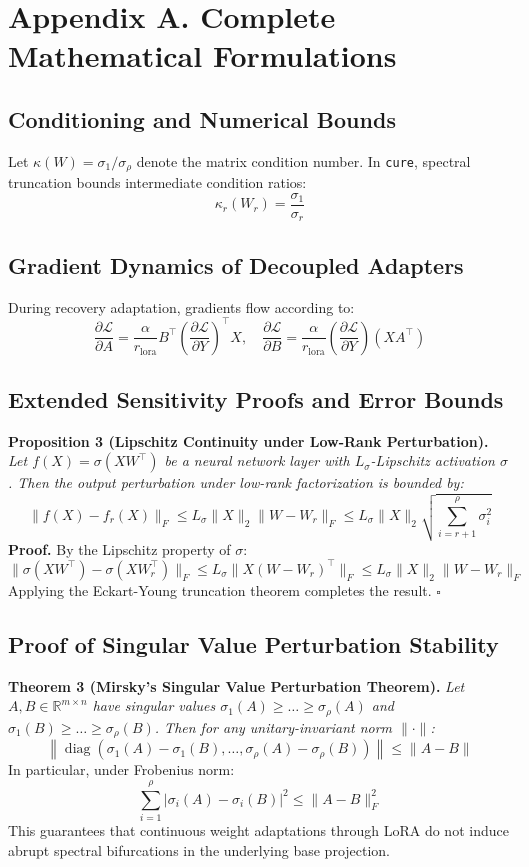 \section*{Appendix A. Complete Mathematical Formulations}

\subsection*{Conditioning and Numerical Bounds}
Let $\kappa(W) = \sigma_1 / \sigma_\rho$ denote the matrix condition number. In \texttt{cure}, spectral truncation bounds intermediate condition ratios:
\[
\kappa_r(W_r) = \frac{\sigma_1}{\sigma_r}
\]

\subsection*{Gradient Dynamics of Decoupled Adapters}
During recovery adaptation, gradients flow according to:
\[
\frac{\partial \mathcal{L}}{\partial A} = \frac{\alpha}{r_{\text{lora}}} B^\top \left( \frac{\partial \mathcal{L}}{\partial Y} \right)^\top X, \quad \frac{\partial \mathcal{L}}{\partial B} = \frac{\alpha}{r_{\text{lora}}} \left( \frac{\partial \mathcal{L}}{\partial Y} \right) (X A^\top)
\]

\subsection*{Extended Sensitivity Proofs and Error Bounds}
\textbf{Proposition 3 (Lipschitz Continuity under Low-Rank Perturbation).} \textit{Let $f(X) = \sigma(X W^\top)$ be a neural network layer with $L_\sigma$-Lipschitz activation $\sigma$. Then the output perturbation under low-rank factorization is bounded by:}
\[
\|f(X) - f_r(X)\|_F \le L_\sigma \|X\|_2 \|W - W_r\|_F \le L_\sigma \|X\|_2 \sqrt{\sum_{i=r+1}^\rho \sigma_i^2}
\]
\textbf{Proof.} By the Lipschitz property of $\sigma$:
\[
\|\sigma(X W^\top) - \sigma(X W_r^\top)\|_F \le L_\sigma \|X (W - W_r)^\top\|_F \le L_\sigma \|X\|_2 \|W - W_r\|_F
\]
Applying the Eckart-Young truncation theorem completes the result. $\square$

\subsection*{Proof of Singular Value Perturbation Stability}
\textbf{Theorem 3 (Mirsky's Singular Value Perturbation Theorem).} \textit{Let $A, B \in \mathbb{R}^{m \times n}$ have singular values $\sigma_1(A) \ge \dots \ge \sigma_\rho(A)$ and $\sigma_1(B) \ge \dots \ge \sigma_\rho(B)$. Then for any unitary-invariant norm $\|\cdot\|$:}
\[
\left\| \operatorname{diag}(\sigma_1(A) - \sigma_1(B), \dots, \sigma_\rho(A) - \sigma_\rho(B)) \right\| \le \|A - B\|
\]
In particular, under Frobenius norm:
\[
\sum_{i=1}^\rho |\sigma_i(A) - \sigma_i(B)|^2 \le \|A - B\|_F^2
\]
This guarantees that continuous weight adaptations through LoRA do not induce abrupt spectral bifurcations in the underlying base projection.

